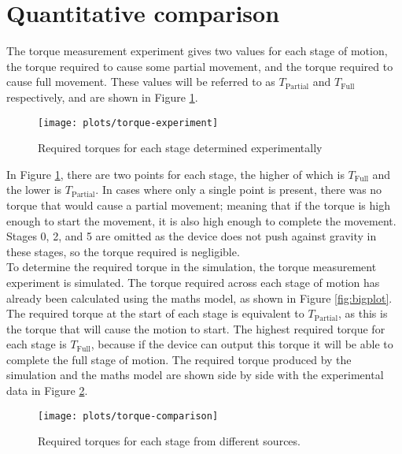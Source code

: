 \section{Quantitative comparison}

The torque measurement experiment gives two values for each stage of motion, the torque required to cause some partial movement, and the torque required to cause full movement. These values will be referred to as $T_\mathrm{Partial}$ and $T_\mathrm{Full}$ respectively, and are shown in Figure \ref{fig:torque-experiment}.

\begin{figure}[!h]
	\centering
	\texttt{[image: plots/torque-experiment]}
	\caption{Required torques for each stage determined experimentally}
	\label{fig:torque-experiment}
\end{figure}

In Figure \ref{fig:torque-experiment}, there are two points for each stage, the higher of which is $T_\mathrm{Full}$ and the lower is $T_\mathrm{Partial}$. In cases where only a single point is present, there was no torque that would cause a partial movement; meaning that if the torque is high enough to start the movement, it is also high enough to complete the movement. Stages 0, 2, and 5 are omitted as the device does not push against gravity in these stages, so the torque required is negligible.\\

To determine the required torque in the simulation, the torque measurement experiment is simulated. The torque required across each stage of motion has already been calculated using the maths model, as shown in Figure \ref{fig:bigplot}. The required torque at the start of each stage is equivalent to $T_\mathrm{Partial}$, as this is the torque that will cause the motion to start. The highest required torque for each stage is $T_\mathrm{Full}$, because if the device can output this torque it will be able to complete the full stage of motion. The required torque produced by the simulation and the maths model are shown side by side with the experimental data in Figure \ref{fig:torque-comparison}.\\

\begin{figure}[!h]
	\centering
	\texttt{[image: plots/torque-comparison]}
	\caption{Required torques for each stage from different sources.}
	\label{fig:torque-comparison}
\end{figure}

